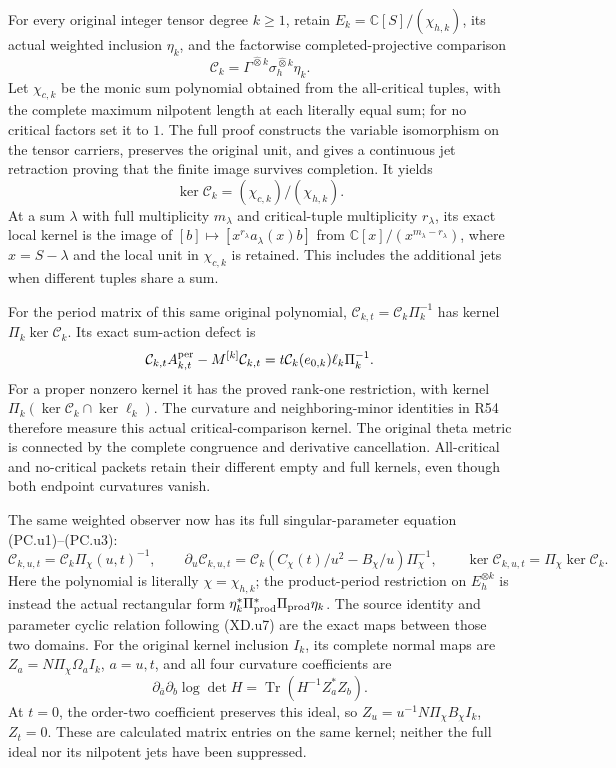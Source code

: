 For every original integer tensor degree \(k\ge1\), retain
\(E_k=\mathbb C[S]/(\chi_{h,k})\), its actual weighted inclusion
\(\eta_k\), and the factorwise completed-projective comparison
\[
 \mathcal C_k=
 \Gamma^{\widehat\otimes k}\sigma_h^{\widehat\otimes k}\eta_k.
\]
Let \(\chi_{c,k}\) be the monic sum polynomial obtained from the
all-critical tuples, with the complete maximum nilpotent length at
each literally equal sum; for no critical factors set it to \(1\).
The full proof constructs the variable isomorphism on the tensor
carriers, preserves the original unit, and gives a continuous jet
retraction proving that the finite image survives completion. It yields
\[
 \boxed{\ker\mathcal C_k=(\chi_{c,k})/(\chi_{h,k}).}
\]
At a sum \(\lambda\) with full multiplicity \(m_\lambda\) and
critical-tuple multiplicity \(r_\lambda\), its exact local kernel
is the image of
\([b]\mapsto[x^{r_\lambda}a_\lambda(x)b]\) from
\(\mathbb C[x]/(x^{m_\lambda-r_\lambda})\), where
\(x=S-\lambda\) and the local unit in \(\chi_{c,k}\) is retained.
This includes the additional jets when different tuples share a sum.

For the period matrix of this same original polynomial,
\(\mathcal C_{k,t}=\mathcal C_k\Pi_k^{-1}\) has kernel
\(\Pi_k\ker\mathcal C_k\). Its exact sum-action defect is
\[
 \mathcal C_{k,t}A_{k,t}^{\rm per}
       -M^{[k]}\mathcal C_{k,t}
   =t\mathcal C_k(e_{0,k})\ell_k\Pi_k^{-1}.
\]
For a proper nonzero kernel it has the proved rank-one restriction,
with kernel \(\Pi_k(\ker\mathcal C_k\cap\ker\ell_k)\).
The curvature and neighboring-minor identities in R54 therefore
measure this actual critical-comparison kernel. The original theta
metric is connected by the complete congruence and derivative
cancellation. All-critical and no-critical packets retain their
different empty and full kernels, even though both endpoint
curvatures vanish.

The same weighted observer now has its full singular-parameter
equation (PC.u1)--(PC.u3):
\[
 \mathcal C_{k,u,t}=\mathcal C_k\Pi_\chi(u,t)^{-1},\qquad
 \partial_u\mathcal C_{k,u,t}
   =\mathcal C_k(C_\chi(t)/u^2-B_\chi/u)\Pi_\chi^{-1},
 \qquad
 \ker\mathcal C_{k,u,t}=\Pi_\chi\ker\mathcal C_k.
\]
Here the polynomial is literally \(\chi=\chi_{h,k}\);
the product-period restriction on \(E_h^{\otimes k}\) is
instead the actual rectangular form
\(\eta_k^*\Pi_{\rm prod}^*\Pi_{\rm prod}\eta_k\).
The source identity and parameter cyclic relation following
(XD.u7) are the exact maps between those two domains.
For the original kernel inclusion \(I_k\), its complete
normal maps are \(Z_a=N\Pi_\chi\Omega_a I_k\), \(a=u,t\),
and all four curvature coefficients are
\[
 \partial_{\bar a}\partial_b\log\det H
       =\operatorname{Tr}(H^{-1}Z_a^*Z_b).
\]
At \(t=0\), the order-two coefficient preserves this ideal,
so \(Z_u=u^{-1}N\Pi_\chi B_\chi I_k\), \(Z_t=0\).
These are calculated matrix entries on the same kernel; neither
the full ideal nor its nilpotent jets have been suppressed.

